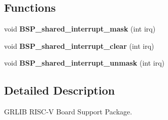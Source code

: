 \subsection*{Functions}
\begin{DoxyCompactItemize}
\item 
\mbox{\label{group__RTEMSBSPsRISCVGRLIB_ga5f113e9992f3497076272b5fb473f336}} 
void {\bfseries B\+S\+P\+\_\+shared\+\_\+interrupt\+\_\+mask} (int irq)
\item 
\mbox{\label{group__RTEMSBSPsRISCVGRLIB_ga700fa96fc6d0ce5340d7b2facc36c15e}} 
void {\bfseries B\+S\+P\+\_\+shared\+\_\+interrupt\+\_\+clear} (int irq)
\item 
\mbox{\label{group__RTEMSBSPsRISCVGRLIB_gad8080ffcdab31a4177a4e9b8f55db25b}} 
void {\bfseries B\+S\+P\+\_\+shared\+\_\+interrupt\+\_\+unmask} (int irq)
\end{DoxyCompactItemize}


\subsection{Detailed Description}
G\+R\+L\+IB R\+I\+S\+C-\/V Board Support Package. 

